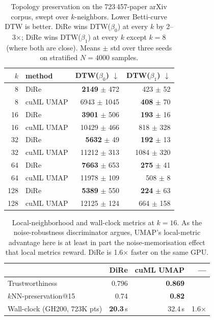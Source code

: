\documentclass[9pt,twocolumn,twoside]{pnas-new}
\begin{document}
\begin{table}[t]
\centering
\small
\setlength{\tabcolsep}{4pt}
\begin{tabular}{@{}rlrr@{}}
\toprule
$k$ & method & DTW($\beta_0$) $\downarrow$ & DTW($\beta_1$) $\downarrow$ \\
\midrule
  8 & DiRe        & \textbf{2149} $\pm$ 472 & 423 $\pm$ 52  \\
  8 & cuML UMAP   & 6943 $\pm$ 1045         & \textbf{408} $\pm$ 70  \\
 16 & DiRe        & \textbf{3901} $\pm$ 506 & \textbf{193} $\pm$ 16  \\
 16 & cuML UMAP   & 10429 $\pm$ 466         & 818 $\pm$ 328 \\
 32 & DiRe        & \textbf{5632} $\pm$ 49  & \textbf{192} $\pm$ 13  \\
 32 & cuML UMAP   & 11212 $\pm$ 313         & 1084 $\pm$ 320 \\
 64 & DiRe        & \textbf{7663} $\pm$ 653 & \textbf{275} $\pm$ 41  \\
 64 & cuML UMAP   & 11978 $\pm$ 109         & 508 $\pm$ 8   \\
128 & DiRe        & \textbf{5389} $\pm$ 550 & \textbf{224} $\pm$ 63  \\
128 & cuML UMAP   & 12125 $\pm$ 124         & 664 $\pm$ 158 \\
\bottomrule
\end{tabular}
\caption{Topology preservation on the 723\,457-paper arXiv corpus, swept
over $k$-neighbors. Lower Betti-curve DTW is better. DiRe wins DTW($\beta_0$)
at every $k$ by 2--3$\times$; DiRe wins DTW($\beta_1$) at every $k$ except
$k = 8$ (where both are close). Means $\pm$ std over three seeds on
stratified $N = 4000$ samples.}
\label{tab:arxiv-sweep}
\end{table}

\begin{table}[t]
\centering
\small
\begin{tabular}{@{}lrrr@{}}
\toprule
            & DiRe  & cuML UMAP & --- \\
\midrule
Trustworthiness               & 0.796     & \textbf{0.869}  & \\
$k$NN-preservation@15         & 0.74      & \textbf{0.82}   & \\
Wall-clock (GH200, 723K pts)  & \textbf{20.3}\,s & 32.4\,s    & 1.6$\times$ \\
\bottomrule
\end{tabular}
\caption{Local-neighborhood and wall-clock metrics at $k = 16$. As the
noise-robustness discriminator argues, UMAP's local-metric advantage here is at
least in part the noise-memorisation effect that local metrics reward.
DiRe is 1.6$\times$ faster on the same GPU.}
\label{tab:arxiv-local}
\end{table}
\end{document}
